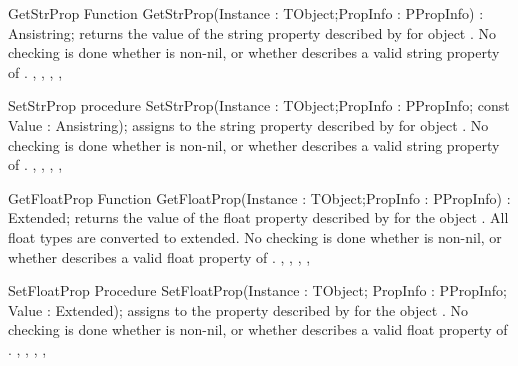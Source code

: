 \begin{function}{GetStrProp}
\Declaration
Function GetStrProp(Instance : TObject;PropInfo : PPropInfo) : Ansistring;
\Description
{} returns the value of the string property described by
 for object . 
\Errors
No checking is done whether  is non-nil, or whether
 describes a valid string property of .
\SeeAlso
{}, , ,
,
\end{function}

\begin{procedure}{SetStrProp}
\Declaration
    procedure SetStrProp(Instance : TObject;PropInfo : PPropInfo;
      const Value : Ansistring);
\Description
{} assigns  to the string property described by
 for object . 
\Errors
No checking is done whether  is non-nil, or whether
 describes a valid string property of .
\SeeAlso
{}, , ,
,


\end{procedure}

\begin{function}{GetFloatProp}
\Declaration
Function GetFloatProp(Instance : TObject;PropInfo : PPropInfo) : Extended;
\Description
{} returns the value of the float property described by 
 for the object . All float types are converted
to extended.
\Errors
No checking is done whether  is non-nil, or whether
 describes a valid float property of .
\SeeAlso
{}, , ,
,
\end{function}


\begin{procedure}{SetFloatProp}
\Declaration
Procedure SetFloatProp(Instance : TObject;
                       PropInfo : PPropInfo;
                       Value : Extended);
\Description
{} assigns  to the property described by
 for the object .
\Errors
No checking is done whether  is non-nil, or whether
 describes a valid float property of .
\SeeAlso
{}, , ,
,

\end{procedure}


